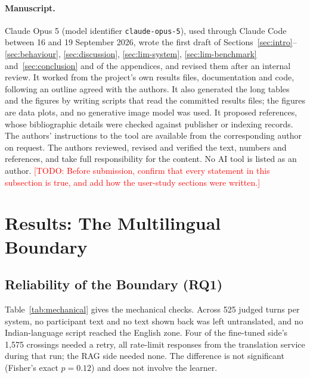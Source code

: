\documentclass[pdflatex,sn-mathphys-num]{sn-jnl}%
\newcommand{\todo}[1]{\textcolor{red}{[TODO: #1]}}
\theoremstyle{thmstyleone}%
\theoremstyle{thmstyletwo}%
\theoremstyle{thmstylethree}%
\begin{document}
\paragraph{Manuscript.} Claude Opus 5 (model identifier \texttt{claude-opus-5}), used through Claude
Code between 16 and 19 September 2026, wrote the first draft of Sections~\ref{sec:intro}--\ref{sec:behaviour},
\ref{sec:discussion}, \ref{sec:lim-system}, \ref{sec:lim-benchmark} and~\ref{sec:conclusion} and of
the appendices, and revised them after an internal review. It worked from the project's own results
files, documentation and code, following an outline agreed with the authors. It also generated the
long tables and the figures by writing scripts that read the committed results files; the figures are
data plots, and no generative image model was used. It proposed references, whose bibliographic
details were checked against publisher or indexing records. The authors' instructions to the tool are
available from the corresponding author on request. The authors reviewed, revised and verified the
text, numbers and references, and take full responsibility for the content. No AI tool is listed as
an author.
\todo{Before submission, confirm that every statement in this subsection is true, and add how the
user-study sections were written.}

\section{Results: The Multilingual Boundary}\label{sec:results}

\subsection{Reliability of the Boundary (RQ1)}\label{sec:res-boundary}

Table~\ref{tab:mechanical} gives the mechanical checks. Across 525 judged turns per system, no
participant text and no text shown back was left untranslated, and no Indian-language script reached
the English zone. Four of the fine-tuned side's 1,575 crossings needed a retry, all rate-limit
responses from the translation service during that run; the RAG side needed none. The difference is
not significant (Fisher's exact $p=0.12$) and does not involve the learner.
\end{document}
